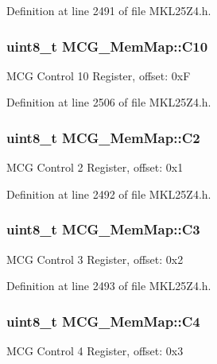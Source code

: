 Definition at line 2491 of file M\+K\+L25\+Z4.\+h.

\subsubsection[{\texorpdfstring{C10}{C10}}]{\setlength{\rightskip}{0pt plus 5cm}uint8\+\_\+t M\+C\+G\+\_\+\+Mem\+Map\+::\+C10}\hypertarget{struct_m_c_g___mem_map_a184325f5e5750f8e816b01aeed13d695}{}\label{struct_m_c_g___mem_map_a184325f5e5750f8e816b01aeed13d695}
M\+CG Control 10 Register, offset\+: 0xF 

Definition at line 2506 of file M\+K\+L25\+Z4.\+h.

\subsubsection[{\texorpdfstring{C2}{C2}}]{\setlength{\rightskip}{0pt plus 5cm}uint8\+\_\+t M\+C\+G\+\_\+\+Mem\+Map\+::\+C2}\hypertarget{struct_m_c_g___mem_map_a7323696b9a1cb6631b8c04ffad3947e5}{}\label{struct_m_c_g___mem_map_a7323696b9a1cb6631b8c04ffad3947e5}
M\+CG Control 2 Register, offset\+: 0x1 

Definition at line 2492 of file M\+K\+L25\+Z4.\+h.

\subsubsection[{\texorpdfstring{C3}{C3}}]{\setlength{\rightskip}{0pt plus 5cm}uint8\+\_\+t M\+C\+G\+\_\+\+Mem\+Map\+::\+C3}\hypertarget{struct_m_c_g___mem_map_a58ca70b30279c98af3471abe38280f01}{}\label{struct_m_c_g___mem_map_a58ca70b30279c98af3471abe38280f01}
M\+CG Control 3 Register, offset\+: 0x2 

Definition at line 2493 of file M\+K\+L25\+Z4.\+h.

\subsubsection[{\texorpdfstring{C4}{C4}}]{\setlength{\rightskip}{0pt plus 5cm}uint8\+\_\+t M\+C\+G\+\_\+\+Mem\+Map\+::\+C4}\hypertarget{struct_m_c_g___mem_map_a3c5615d70ed3f2d3664de1a8fdbe9983}{}\label{struct_m_c_g___mem_map_a3c5615d70ed3f2d3664de1a8fdbe9983}
M\+CG Control 4 Register, offset\+: 0x3 

